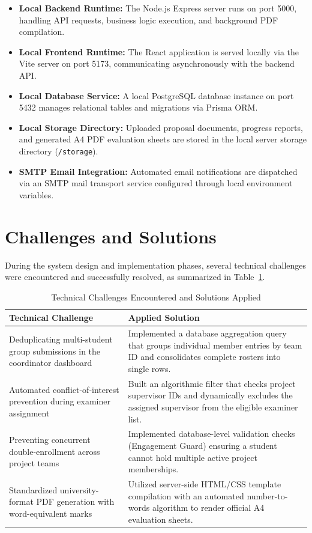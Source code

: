 \begin{itemize}
  \item \textbf{Local Backend Runtime:} The Node.js Express server runs on port 5000, handling API requests, business logic execution, and background PDF compilation.
  
  \item \textbf{Local Frontend Runtime:} The React application is served locally via the Vite server on port 5173, communicating asynchronously with the backend API.
  
  \item \textbf{Local Database Service:} A local PostgreSQL database instance on port 5432 manages relational tables and migrations via Prisma ORM.
  
  \item \textbf{Local Storage Directory:} Uploaded proposal documents, progress reports, and generated A4 PDF evaluation sheets are stored in the local server storage directory (\texttt{/storage}).
  
  \item \textbf{SMTP Email Integration:} Automated email notifications are dispatched via an SMTP mail transport service configured through local environment variables.
\end{itemize}

\section{Challenges and Solutions}
During the system design and implementation phases, several technical challenges were encountered and successfully resolved, as summarized in Table~\ref{tab:challenges}.

\begin{table}[H]
\centering
\caption{Technical Challenges Encountered and Solutions Applied}
\label{tab:challenges}
\vspace{4pt}
\small
\begin{tabularx}{\textwidth}{@{}p{4.5cm} X@{}}
\toprule
\textbf{Technical Challenge} & \textbf{Applied Solution} \\
\midrule
Deduplicating multi-student group submissions in the coordinator dashboard & Implemented a database aggregation query that groups individual member entries by team ID and consolidates complete rosters into single rows. \\
\addlinespace
Automated conflict-of-interest prevention during examiner assignment & Built an algorithmic filter that checks project supervisor IDs and dynamically excludes the assigned supervisor from the eligible examiner list. \\
\addlinespace
Preventing concurrent double-enrollment across project teams & Implemented database-level validation checks (Engagement Guard) ensuring a student cannot hold multiple active project memberships. \\
\addlinespace
Standardized university-format PDF generation with word-equivalent marks & Utilized server-side HTML/CSS template compilation with an automated number-to-words algorithm to render official A4 evaluation sheets. \\
\bottomrule
\end{tabularx}
\end{table}
